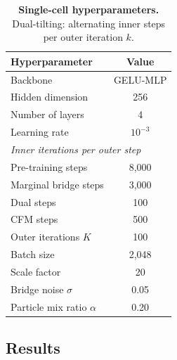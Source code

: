 \documentclass[11pt]{article}
\theoremstyle{definition}
\numberwithin{equation}{section}%
\begin{document}
\begin{table}[ht]
\centering
\caption{%
  \textbf{Single-cell hyperparameters.}
  Dual-tilting: alternating inner steps per outer iteration $k$.
}
\label{tab:singlecell_hparams}
\small
\begin{tabular}{lc}
\toprule
Hyperparameter & Value \\
\midrule
Backbone & GELU-MLP \\
Hidden dimension & 256 \\
Number of layers & 4 \\
Learning rate & $10^{-3}$ \\
\midrule
\multicolumn{2}{l}{\emph{Inner iterations per outer step}} \\
\quad Pre-training steps & 8{,}000 \\
\quad Marginal bridge steps & 3{,}000 \\
\quad Dual steps & 100 \\
\quad CFM steps & 500 \\
\midrule
Outer iterations $K$ & 100 \\
Batch size & 2{,}048 \\
Scale factor & 20 \\
Bridge noise $\sigma$ & 0.05 \\
Particle mix ratio $\alpha$ & 0.20 \\
\bottomrule
\end{tabular}
\end{table}

\subsection{Results}
\end{document}
